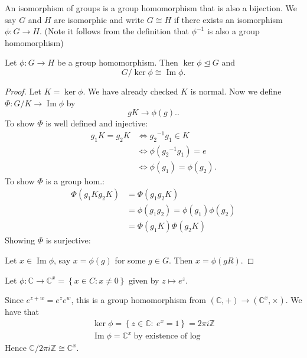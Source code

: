 \documentclass[a4paper]{scrartcl}
\begin{document}
\begin{definition*}[Isomorphism]
      An isomorphism of groups is a group homomorphism that is also a bijection. We say $G$ and $H$ are isomorphic and write $G \cong H$ if there exists an isomorphism $\phi: G \rightarrow H$. (Note it follows from the definition that ${\phi}^{-1}$ is also a group homomorphism)
\end{definition*}

\begin{theorem}
      Let $\phi: G \rightarrow H$ be a group homomorphism. Then $\operatorname{ker}\phi \unlhd G$ and \[
      G/\operatorname{ker}\phi \cong \operatorname{Im} \phi
      .\] 
\end{theorem}
\begin{proof}
      Let $K=\operatorname{ker} \phi$. We have already checked $K$ is normal. Now we define $\Phi: G/K \rightarrow \operatorname{Im} \phi$ by \[
      gK \rightarrow \phi (g).
      .\]
      To show $\Phi$ is well defined and injective: 
      \begin{align*}
           g_1 K= g_2 K &\iff {g_2 }^{-1}g_1 \in K\\
           &\iff \phi ({g_2 }^{-1}g_1 )=e\\
           &\iff \phi (g_1 )=\phi (g_2 ). 
      \end{align*}
      To show $\Phi$ is a group hom.: 
      \begin{align*}
           \Phi (g_1 K g_2 K)&=\Phi (g_1 g_2 K)\\
           &=\phi (g_1 g_2 )=\phi (g_1 ) \phi (g_2 )\\
           &=\Phi (g_1 K) \Phi (g_2 K)
      \end{align*}
      Showing $\Phi$ is surjective:

      Let $x \in \operatorname{Im} \phi$, say $x= \phi (g)$ for some $g \in G$. Then $x=\phi (gR)$.
\end{proof}
\begin{example*}
      Let $\phi: \mathbb{C} \rightarrow \mathbb{C}^x= \left\{x \in C: x \neq 0\right\}$ given by $z \mapsto e^{z}$.

      Since $e^{z+w}=e^{z}e^{w}$, this is a group homomorphism from $(\mathbb{C},+) \rightarrow (\mathbb{C}^{x},\times)$. We have that 
      \begin{align*}
          \operatorname{ker} \phi= \left\{z \in \mathbb{C}: \ e^x=1\right\}=2 \pi i \mathbb{Z}\\
          \operatorname{Im} \phi=\mathbb{C}^{x} \ \text{by existence of log}
      \end{align*}
      Hence $\mathbb{C}/2 \pi i \mathbb{Z} \cong \mathbb{C}^{x}$. 
\end{example*}
\end{document}
